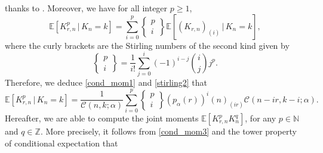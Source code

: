 \documentclass[twoside,12pt]{article}
\newcommand{\E}{\mathds{E}}
\begin{document}
thanks to \citet[Theorem 2.15 ]{Cha(05)}. Moreover, we have for all integer $p\geq 1$,
\begin{equation}
\label{stirling2}
\E[K_{r,n}^p \,|\,K_{n}=k]=\sum_{i=0}^p \left\{ 
\begin{matrix}
p \\i 
\end{matrix}
\right\}
\E[(K_{r,n})_{(i)}\,|\,K_{n}=k],
\end{equation}
where the curly brackets are the Stirling numbers of the second kind given by
$$
\left\{ 
\begin{matrix}
p \\i
\end{matrix}
\right\}= \frac{1}{i!}\sum_{j=0}^i (-1)^{i-j}  {i\choose j} j^p.
$$
Therefore, we deduce \eqref{cond_mom1} and \eqref{stirling2} that
\begin{equation}\label{cond_mom3}
\E[K_{r,n}^{p}\,|\,K_{n}=k]=\frac{1}{\mathscr{C}(n,k;\alpha)}\sum_{i=0}^p \left\{ 
\begin{matrix}
p \\i 
\end{matrix}
\right\}
\left(p_\alpha(r)\right)^{i}(n)_{(ir)}\mathscr{C}(n-ir,k-i;\alpha).
\end{equation}
Hereafter, we are able to compute the joint moments $\E[K_{r,n}^{p}K_{n}^{q}]$, for any $p\in\mathbb{N}$ and $q\in\mathbb{Z}$. More precisely, it follows from \eqref{cond_mom3} and the tower property of conditional expectation that
\end{document}
